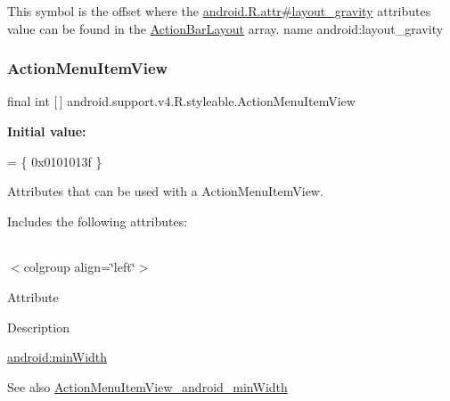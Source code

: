 This symbol is the offset where the \hyperlink{}{android.\+R.\+attr\#layout\+\_\+gravity} attribute\textquotesingle{}s value can be found in the \hyperlink{classandroid_1_1support_1_1v4_1_1R_1_1styleable_a37ea3f1caf51d0b0a3db37a7ec954040}{Action\+Bar\+Layout} array.  name android\+:layout\+\_\+gravity \mbox{\label{classandroid_1_1support_1_1v4_1_1R_1_1styleable_a061b93f235efedcc9ec8af9ff1428785}} 
\subsubsection{\texorpdfstring{Action\+Menu\+Item\+View}{ActionMenuItemView}}
{\footnotesize\ttfamily final int \mbox{[}$\,$\mbox{]} android.\+support.\+v4.\+R.\+styleable.\+Action\+Menu\+Item\+View\hspace{0.3cm}{\ttfamily [static]}}

{\bfseries Initial value\+:}
\begin{DoxyCode}
= \{
            0x0101013f
        \}
\end{DoxyCode}
Attributes that can be used with a Action\+Menu\+Item\+View. 

Includes the following attributes\+:

\tabulinesep=1mm
\begin{longtabu} spread 0pt [c]{*{0}{|X[-1]}|}
\hline
\end{longtabu}
$<$colgroup align=\char`\"{}left\char`\"{}$>$ 

Attribute

Description 

{\ttfamily \hyperlink{classandroid_1_1support_1_1v4_1_1R_1_1styleable_ac2cec25459cc551c201c3e15e58b8c50}{android\+:min\+Width}}

\begin{DoxySeeAlso}{See also}
\hyperlink{classandroid_1_1support_1_1v4_1_1R_1_1styleable_ac2cec25459cc551c201c3e15e58b8c50}{Action\+Menu\+Item\+View\+\_\+android\+\_\+min\+Width} 
\end{DoxySeeAlso}
\mbox{\label{classandroid_1_1support_1_1v4_1_1R_1_1styleable_ac2cec25459cc551c201c3e15e58b8c50}} 
